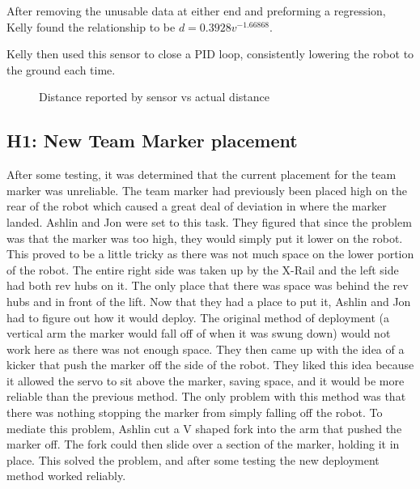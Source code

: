 \documentclass{article}
\begin{document}
After removing the unusable data at either end and preforming a regression, Kelly found the relationship to be $d=0.3928 v^{-1.66868}$. 

Kelly then used this sensor to close a PID loop, consistently lowering the robot to the ground each time.


\begin {figure}
\centering
{}
\caption {Distance reported by sensor vs actual distance}
\label {fig:graph}
\end{figure}
\subsection{H1: New Team Marker placement}

After some testing, it was determined that the current placement for the team marker was unreliable. The team marker had previously been placed high on the rear of the robot which caused a great deal of deviation in where the marker landed. Ashlin and Jon were set to this task. They figured that since the problem was that the marker was too high, they would simply put it lower on the robot. This proved to be a little tricky as there was not much space on the lower portion of the robot. The entire right side was taken up by the X-Rail and the left side had both rev hubs on it. The only place that there was space was behind the rev hubs and in front of the lift. Now that they had a place to put it, Ashlin and Jon had to figure out how it would deploy. The original method of deployment (a vertical arm the marker would fall off of when it was swung down) would not work here as there was not enough space. They then came up with the idea of a kicker that push the marker off the side of the robot. They liked this idea because it allowed the servo to sit above the marker, saving space, and it would be more reliable than the previous method. The only problem with this method was that there was nothing stopping the marker from simply falling off the robot. To mediate this problem, Ashlin cut a V shaped fork into the arm that pushed the marker off. The fork could then slide over a section of the marker, holding it in place. This solved the problem, and after some testing the new deployment method worked reliably.
\end{document}
